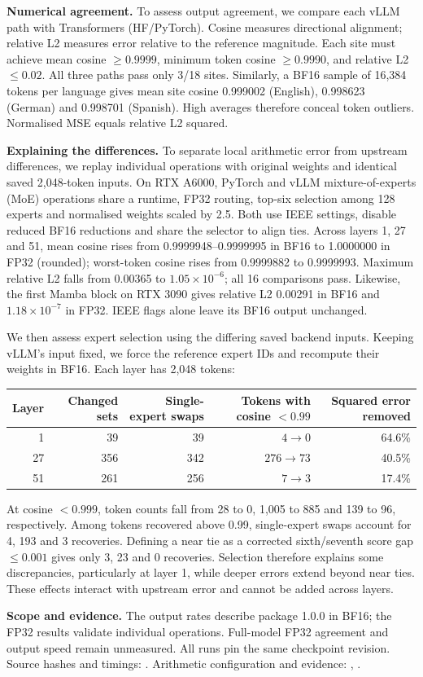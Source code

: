 \documentclass[10pt,a4paper]{article}
\begin{document}
\textbf{Numerical agreement.} To assess output agreement, we compare each vLLM path with Transformers (HF/PyTorch). Cosine measures directional alignment; relative L2 measures error relative to the reference magnitude. Each site must achieve mean cosine $\geq0.9999$, minimum token cosine $\geq0.9990$, and relative L2 $\leq0.02$. All three paths pass only 3/18 sites. Similarly, a BF16 sample of 16,384 tokens per language gives mean site cosine 0.999002 (English), 0.998623 (German) and 0.998701 (Spanish). High averages therefore conceal token outliers. Normalised MSE equals relative L2 squared.

\textbf{Explaining the differences.} To separate local arithmetic error from upstream differences, we replay individual operations with original weights and identical saved 2,048-token inputs. On RTX A6000, PyTorch and vLLM mixture-of-experts (MoE) operations share a runtime, FP32 routing, top-six selection among 128 experts and normalised weights scaled by 2.5. Both use IEEE settings, disable reduced BF16 reductions and share the selector to align ties. Across layers 1, 27 and 51, mean cosine rises from 0.9999948--0.9999995 in BF16 to 1.0000000 in FP32 (rounded); worst-token cosine rises from 0.9999882 to 0.9999993. Maximum relative L2 falls from 0.00365 to $1.05\times10^{-6}$; all 16 comparisons pass. Likewise, the first Mamba block on RTX 3090 gives relative L2 0.00291 in BF16 and $1.18\times10^{-7}$ in FP32. IEEE flags alone leave its BF16 output unchanged.

We then assess expert selection using the differing saved backend inputs. Keeping vLLM's input fixed, we force the reference expert IDs and recompute their weights in BF16. Each layer has 2,048 tokens:
\begin{center}
\small
\begin{tabular}{rrrrr}
\toprule
Layer & Changed sets & Single-expert swaps & Tokens with cosine $<0.99$ & Squared error removed\\
\midrule
1 & 39 & 39 & $4\to0$ & 64.6\%\\
27 & 356 & 342 & $276\to73$ & 40.5\%\\
51 & 261 & 256 & $7\to3$ & 17.4\%\\
\bottomrule
\end{tabular}
\end{center}
At cosine $<0.999$, token counts fall from 28 to 0, 1,005 to 885 and 139 to 96, respectively. Among tokens recovered above 0.99, single-expert swaps account for 4, 193 and 3 recoveries. Defining a near tie as a corrected sixth/seventh score gap $\leq0.001$ gives only 3, 23 and 0 recoveries. Selection therefore explains some discrepancies, particularly at layer 1, while deeper errors extend beyond near ties. These effects interact with upstream error and cannot be added across layers.

\textbf{Scope and evidence.} The output rates describe package 1.0.0 in BF16; the FP32 results validate individual operations. Full-model FP32 agreement and output speed remain unmeasured. All runs pin the same checkpoint revision. Source hashes and timings: . Arithmetic configuration and evidence: , .
\end{document}
